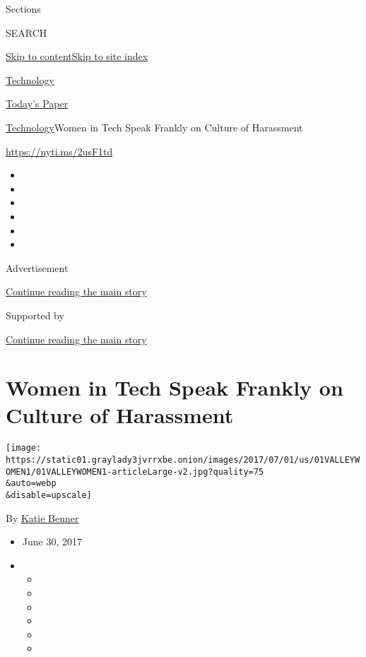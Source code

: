 Sections

SEARCH

\protect\hyperlink{site-content}{Skip to
content}\protect\hyperlink{site-index}{Skip to site index}

\href{https://www.nytimes3xbfgragh.onion/section/technology}{Technology}

\href{https://myaccount.nytimes3xbfgragh.onion/auth/login?response_type=cookie\&client_id=vi}{}

\href{https://www.nytimes3xbfgragh.onion/section/todayspaper}{Today's
Paper}

\href{/section/technology}{Technology}\textbar{}Women in Tech Speak
Frankly on Culture of Harassment

\url{https://nyti.ms/2usF1td}

\begin{itemize}
\item
\item
\item
\item
\item
\item
\end{itemize}

Advertisement

\protect\hyperlink{after-top}{Continue reading the main story}

Supported by

\protect\hyperlink{after-sponsor}{Continue reading the main story}

\hypertarget{women-in-tech-speak-frankly-on-culture-of-harassment}{%
\section{Women in Tech Speak Frankly on Culture of
Harassment}\label{women-in-tech-speak-frankly-on-culture-of-harassment}}

\texttt{[image: https://static01.graylady3jvrrxbe.onion/images/2017/07/01/us/01VALLEYWOMEN1/01VALLEYWOMEN1-articleLarge-v2.jpg?quality=75\\\&auto=webp\\\&disable=upscale]}

By \href{http://www.nytimes3xbfgragh.onion/by/katie-benner}{Katie
Benner}

\begin{itemize}
\item
  June 30, 2017
\item
  \begin{itemize}
  \item
  \item
  \item
  \item
  \item
  \item
  \end{itemize}
\end{itemize}

